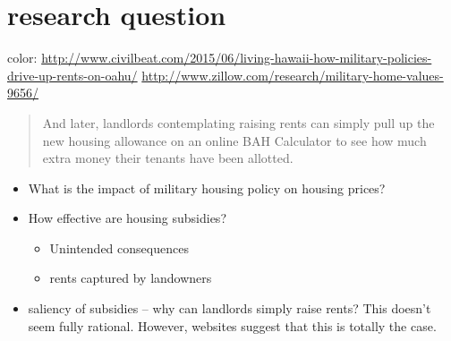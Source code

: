 \documentclass{article}
\begin{document}
\section{research question}
color: \url{http://www.civilbeat.com/2015/06/living-hawaii-how-military-policies-drive-up-rents-on-oahu/} 
\url{http://www.zillow.com/research/military-home-values-9656/}
\begin{quote}
  And later, landlords contemplating raising rents can simply pull up
  the new housing allowance on an online BAH Calculator to see how
  much extra money their tenants have been allotted.
\end{quote}
\begin{itemize}
\item What is the impact of military housing policy on housing prices?
\item How effective are housing subsidies? 
  \begin{itemize}
  \item Unintended consequences
  \item rents captured by landowners
  \end{itemize}
\item saliency of subsidies -- why can landlords simply raise rents?
  This doesn't seem fully rational. However, websites suggest that
  this is totally the case.

\end{itemize}
\end{document}
